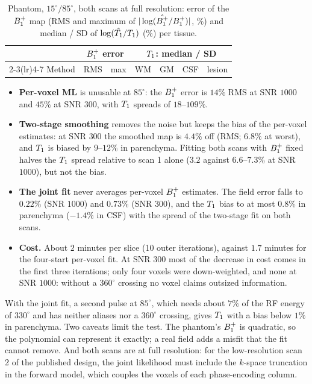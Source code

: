 \begin{table}[!htbp]
\centering
\caption{Phantom, $15^\circ/85^\circ$, both scans at full resolution: error of the $B_1^{+}$ map
(RMS and maximum of $|\log(\hat{B_1^{+}}/B_1^{+})|$, \%) and median / SD of $\log(\hat{T_1}/T_1)$ (\%) per tissue.}
\label{tab:polyb1}
\small
\begin{tabular}{lcccccc}
\toprule
& \multicolumn{2}{c}{$B_1^{+}$ error} & \multicolumn{4}{c}{$T_1$: median / SD}\\
\cmidrule(lr){2-3}\cmidrule(lr){4-7}
Method & RMS & max & WM & GM & CSF & lesion\\
\midrule

\bottomrule
\end{tabular}
\end{table}

\begin{itemize}
\item \textbf{Per-voxel ML} is unusable at $85^\circ$: the $B_1^{+}$ error is $14\%$ RMS at SNR $1000$ and
  $45\%$ at SNR $300$, with $T_1$ spreads of $18$--$109\%$.
\item \textbf{Two-stage smoothing} removes the noise but keeps the bias of the per-voxel estimates:
  at SNR $300$ the smoothed map is $4.4\%$ off (RMS; $6.8\%$ at worst), and $T_1$ is biased by
  $9$--$12\%$ in parenchyma. Fitting both scans with $B_1^{+}$ fixed halves the $T_1$ spread relative to
  scan 1 alone ($3.2$ against $6.6$--$7.3\%$ at SNR $1000$), but not the bias.
\item \textbf{The joint fit} never averages per-voxel $B_1^{+}$ estimates. The field error falls to
  $0.22\%$ (SNR $1000$) and $0.73\%$ (SNR $300$), and the $T_1$ bias to at most $0.8\%$ in parenchyma
  ($-1.4\%$ in CSF) with the spread of the two-stage fit on both scans.
\item \textbf{Cost.} About $2$ minutes per slice (10 outer iterations), against $1.7$ minutes for the
  four-start per-voxel fit. At SNR $300$ most of the decrease in cost comes in the first three
  iterations; only four voxels were down-weighted, and none at SNR $1000$: without a $360^\circ$
  crossing no voxel claims outsized information.
\end{itemize}

With the joint fit, a second pulse at $85^\circ$, which needs about $7\%$ of the RF energy of
$330^\circ$ and has neither aliases nor a $360^\circ$ crossing, gives $T_1$ with a bias below $1\%$ in
parenchyma. Two caveats limit the test. The phantom's $B_1^{+}$ is quadratic, so the polynomial can
represent it exactly; a real field adds a misfit that the fit cannot remove. And both scans are at
full resolution: for the low-resolution scan 2 of the published design, the joint likelihood
must include the $k$-space truncation in the forward model, which couples the voxels of each
phase-encoding column.
